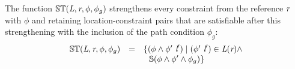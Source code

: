 \begin{definition}
\label{def:ST}
The function $\mathbb{ST}(\emph{L},\emph{r},\phi,\phi_g)$
strengthens every constraint from the reference $\emph{r}$ with
$\phi$ and retaining location-constraint pairs that are satisfiable
after this strengthening with the inclusion of the path condition $\phi_g$:
\[
\begin{array}{rcl} 
\mathbb{ST}(\cfgnt{L},\cfgnt{r},\phi,\phi_g) & = & \{ (\phi\wedge\phi^\prime\ \cfgnt{l}^\prime) \mid (\phi^\prime\ \cfgnt{l}^\prime)\in \cfgnt{L}(\cfgnt{r})\wedge \\ & & 
\ \ \mathbb{S}(\phi\wedge\phi^\prime\wedge\phi_g) \}
\end{array}
\]
\end{definition}
